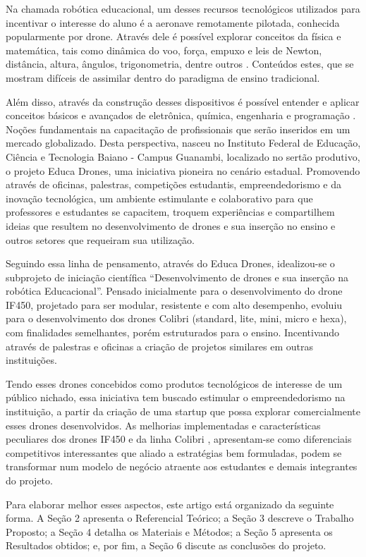 \documentclass[conference]{IEEEtran}
\begin{document}
Na chamada robótica educacional, um desses recursos tecnológicos  utilizados para incentivar o interesse do aluno é a aeronave remotamente pilotada, conhecida popularmente por drone. Através dele é possível explorar conceitos da física e matemática, tais como dinâmica do voo, força, empuxo e leis de Newton, distância, altura, ângulos, trigonometria, dentre outros \cite{b11}. Conteúdos estes, que se mostram difíceis de assimilar dentro do paradigma de ensino tradicional.

Além disso, através da construção desses dispositivos é possível entender e aplicar conceitos básicos e avançados de eletrônica, química, engenharia e programação \cite{b12}. Noções fundamentais na capacitação de profissionais que serão inseridos em um mercado globalizado. Desta perspectiva, nasceu no Instituto Federal de Educação, Ciência e Tecnologia Baiano - Campus Guanambi, localizado no sertão produtivo, o projeto Educa Drones, uma iniciativa pioneira no cenário estadual. Promovendo através de oficinas, palestras, competições estudantis, empreendedorismo e da inovação tecnológica, um ambiente estimulante e colaborativo para que professores e estudantes se capacitem, troquem experiências e compartilhem ideias que resultem no desenvolvimento de drones e sua inserção no ensino e outros setores que requeiram sua utilização.

Seguindo essa linha de pensamento, através do Educa Drones, idealizou-se o subprojeto de iniciação científica “Desenvolvimento de drones e sua inserção na robótica Educacional”. Pensado inicialmente para o desenvolvimento do drone IF450, projetado para ser modular, resistente  e com alto desempenho, evoluiu para o desenvolvimento dos drones Colibri (standard, lite, mini, micro e hexa), com finalidades semelhantes, porém estruturados para o ensino. Incentivando através de palestras e oficinas a criação de projetos similares em outras instituições.

Tendo esses drones concebidos como produtos tecnológicos de interesse de um público nichado, essa iniciativa tem buscado estimular o empreendedorismo na instituição, a partir da criação de uma startup que possa explorar comercialmente esses drones desenvolvidos. As melhorias implementadas e características peculiares dos drones IF450 e da linha Colibri , apresentam-se como diferenciais competitivos interessantes que aliado a estratégias bem formuladas, podem se transformar num modelo de negócio atraente aos estudantes e demais integrantes do projeto. 

Para elaborar melhor esses aspectos, este artigo está organizado da seguinte forma. A Seção 2 apresenta o Referencial Teórico; a Seção 3 descreve o Trabalho Proposto; a Seção 4 detalha os Materiais e Métodos; a Seção 5 apresenta os Resultados obtidos; e, por fim, a Seção 6 discute as conclusões do projeto.
\end{document}
